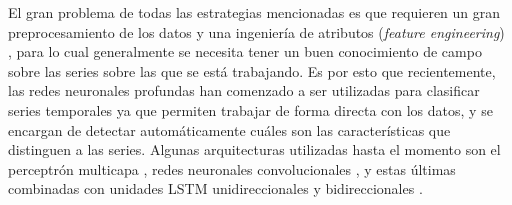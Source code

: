 \documentclass[../../main.tex]{subfiles}
\begin{document}
El gran problema de todas las estrategias mencionadas es que requieren un gran preprocesamiento de los datos y una ingeniería de atributos (\textit{feature engineering}) \cite{wang2016timeseriesclassificationscratch}, para lo cual generalmente se necesita tener un buen conocimiento de campo sobre las series sobre las que se está trabajando. Es por esto que recientemente, las redes neuronales profundas han comenzado a ser utilizadas para clasificar series temporales \cite{wang2016timeseriesclassificationscratch} ya que permiten trabajar de forma directa con los datos, y se encargan de detectar automáticamente cuáles son las características que distinguen a las series. Algunas arquitecturas utilizadas hasta el momento son el perceptrón multicapa \cite{wang2016timeseriesclassificationscratch}, redes neuronales convolucionales \cite{wang2016timeseriesclassificationscratch}, y estas últimas combinadas con unidades LSTM unidireccionales \cite{Karim_2018} y bidireccionales \cite{khan2021-bilstm-for-unitsc}.
\end{document}
